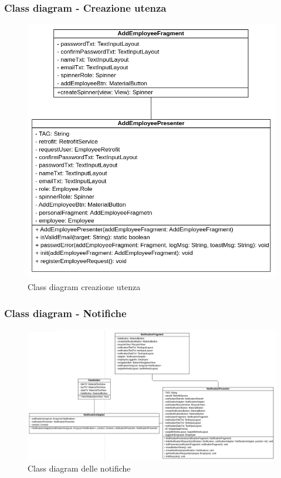 \subsubsection{Class diagram - Creazione utenza}
\begin{figure}[H]
  \centering
  \includegraphics[scale=0.8]{img/class_diagrams_design/addEmployee.png}
  \caption{Class diagram creazione utenza}
\end{figure}
\newpage
\subsubsection{Class diagram - Notifiche}
\begin{figure}[H]
  \centering
  \includegraphics[scale=0.44]{img/class_diagrams_design/notification.png}
  \caption{Class diagram delle notifiche}
\end{figure}
\newpage

